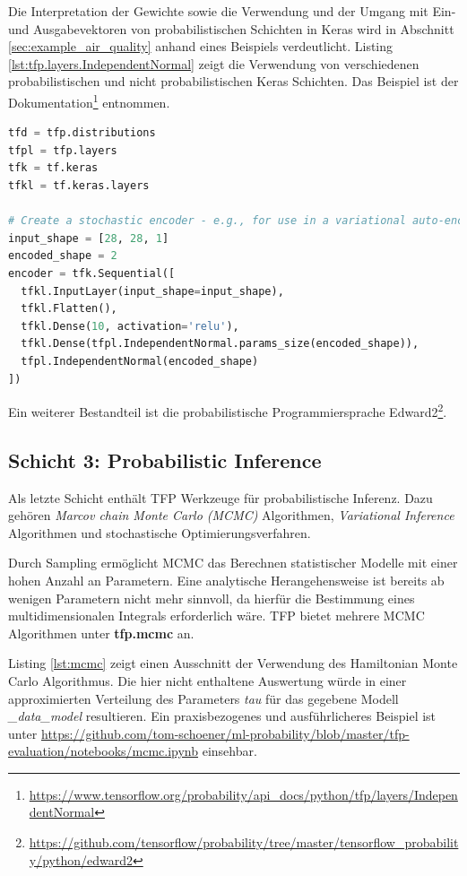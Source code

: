 \documentclass[12pt]{article}
\begin{document}
Die Interpretation der Gewichte sowie die Verwendung und der Umgang mit Ein- und Ausgabevektoren von probabilistischen Schichten in Keras wird in Abschnitt \ref{sec:example_air_quality} anhand eines Beispiels verdeutlicht. Listing \ref{lst:tfp.layers.IndependentNormal} zeigt die Verwendung von verschiedenen probabilistischen und nicht probabilistischen Keras Schichten. Das Beispiel ist der Dokumentation\footnote{\url{https://www.tensorflow.org/probability/api_docs/python/tfp/layers/IndependentNormal}} entnommen. 

\begin{lstlisting}[language=Python, caption={Beispiel probabilistischer und nicht probabilistischer Keras Schichten}, label={lst:tfp.layers.IndependentNormal}]
tfd = tfp.distributions
tfpl = tfp.layers
tfk = tf.keras
tfkl = tf.keras.layers

# Create a stochastic encoder - e.g., for use in a variational auto-encoder
input_shape = [28, 28, 1]
encoded_shape = 2
encoder = tfk.Sequential([
  tfkl.InputLayer(input_shape=input_shape),
  tfkl.Flatten(),
  tfkl.Dense(10, activation='relu'),
  tfkl.Dense(tfpl.IndependentNormal.params_size(encoded_shape)),
  tfpl.IndependentNormal(encoded_shape)
])
\end{lstlisting}

Ein weiterer Bestandteil ist die probabilistische Programmiersprache Edward2\footnote{\url{https://github.com/tensorflow/probability/tree/master/tensorflow_probability/python/edward2}}.

\subsection{Schicht 3: Probabilistic Inference}
\label{sec:layer3}
Als letzte Schicht enthält TFP Werkzeuge für probabilistische Inferenz. Dazu gehören \textit{Marcov chain Monte Carlo (MCMC)} Algorithmen, \textit{Variational Inference} Algorithmen und stochastische Optimierungsverfahren. 

Durch Sampling ermöglicht MCMC das Berechnen statistischer Modelle mit einer hohen Anzahl an Parametern. Eine analytische Herangehensweise ist bereits ab wenigen Parametern nicht mehr sinnvoll, da hierfür die Bestimmung eines multidimensionalen Integrals erforderlich wäre. TFP bietet mehrere MCMC Algorithmen unter \textbf{tfp.mcmc} an. 

Listing \ref{lst:mcmc} zeigt einen Ausschnitt der Verwendung des Hamiltonian Monte Carlo Algorithmus. Die hier nicht enthaltene Auswertung würde in einer approximierten Verteilung des Parameters \textit{tau} für das gegebene Modell \textit{\_data\_model} resultieren. Ein praxisbezogenes und ausführlicheres Beispiel ist unter \url{https://github.com/tom-schoener/ml-probability/blob/master/tfp-evaluation/notebooks/mcmc.ipynb} einsehbar.
\end{document}
